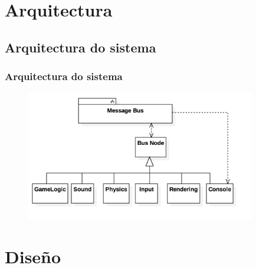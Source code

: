 \documentclass{beamer}
\begin{document}
\section{Arquitectura}
\subsection{Arquitectura do sistema}
\begin{frame}
\frametitle{Arquitectura do sistema}


\begin{figure}
	\includegraphics[width=10cm]{../otros/UML/png/final_arq.png}
	\label{dia:arquitectura_final}
\end{figure}

\end{frame}

\section{Diseño}
\subsection{}
\end{document}
